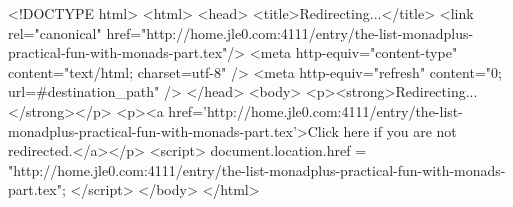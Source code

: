 <!DOCTYPE html>
<html>
<head>
<title>Redirecting...</title>
<link rel="canonical" href="http://home.jle0.com:4111/entry/the-list-monadplus-practical-fun-with-monads-part.tex"/>
<meta http-equiv="content-type" content="text/html; charset=utf-8" />
<meta http-equiv="refresh" content="0; url=#{destination_path}" />
</head>
<body>
  <p><strong>Redirecting...</strong></p>
  <p><a href='http://home.jle0.com:4111/entry/the-list-monadplus-practical-fun-with-monads-part.tex'>Click here if you are not redirected.</a></p>
  <script>
    document.location.href = "http://home.jle0.com:4111/entry/the-list-monadplus-practical-fun-with-monads-part.tex";
  </script>
</body>
</html>
